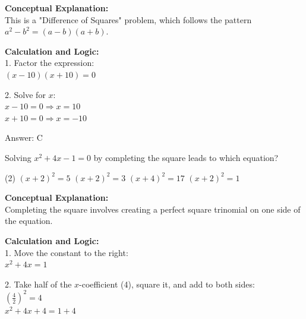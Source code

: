 \documentclass[11pt,paper=a4,answers]{exam}
\begin{document}
\begin{questions}
\begin{solution}
\textbf{Conceptual Explanation:} \\
This is a "Difference of Squares" problem, which follows the pattern $a^2 - b^2 = (a - b)(a + b)$.

\vspace{15pt}

\textbf{Calculation and Logic:} \\
1. Factor the expression: \\
   $(x - 10)(x + 10) = 0$

\vspace{10pt}

2. Solve for $x$: \\
   $x - 10 = 0 \Rightarrow x = 10$ \\
   $x + 10 = 0 \Rightarrow x = -10$

\vspace{20pt}

Answer: \colorbox{yellow!100}{C}
\end{solution}

\vspace{30pt}

\question
Solving $x^2 + 4x - 1 = 0$ by completing the square leads to which equation?
\begin{tasks}(2)
    \task $(x + 2)^2 = 5$
    \task $(x + 2)^2 = 3$
    \task $(x + 4)^2 = 17$
    \task $(x + 2)^2 = 1$
\end{tasks}

\begin{solution}
\textbf{Conceptual Explanation:} \\
Completing the square involves creating a perfect square trinomial on one side of the equation.

\vspace{15pt}

\textbf{Calculation and Logic:} \\
1. Move the constant to the right: \\
   $x^2 + 4x = 1$

\vspace{10pt}

2. Take half of the $x$-coefficient (4), square it, and add to both sides: \\
   $(\frac{4}{2})^2 = 4$ \\
   $x^2 + 4x + 4 = 1 + 4$

\vspace{10pt}


\end{solution}
\end{questions}
\end{document}
